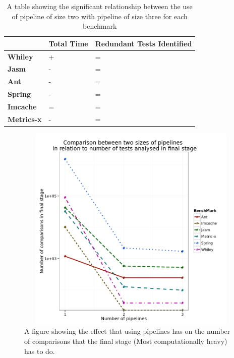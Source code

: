 \documentclass[11pt
              , a4paper
              , twoside
              , openright
              ]{report}
\begin{document}
\begin{table}[h]
\centering
\begin{tabular}{|l|l|l|}
\hline
{\bf }          & {\bf Total Time} & {\bf Redundant Tests Identified} \\ \hline
{\bf Whiley}    & +                & =                           \\ \hline
{\bf Jasm}      & -                & =                           \\ \hline
{\bf Ant}       & -                & =                           \\ \hline
{\bf Spring}    & -                & =                           \\ \hline
{\bf Imcache}   & =                & =                           \\ \hline
{\bf Metrics-x} & -                & =                           \\ \hline
\end{tabular}
\caption{A table showing the significant relationship between the use of pipeline of size two with pipeline of size three for each benchmark}
\label{pipelinesig}
\end{table}

\begin{figure}[h]
\begin{center}
\includegraphics[height=10cm, width = 14.5cm]{Pipeline.png}
\end{center}
\caption{A figure showing the effect that using pipelines has on the number of comparisons that the final stage (Most computationally heavy) has to do.}
\label{fig:pipelinegraph}
\end{figure}
\end{document}
